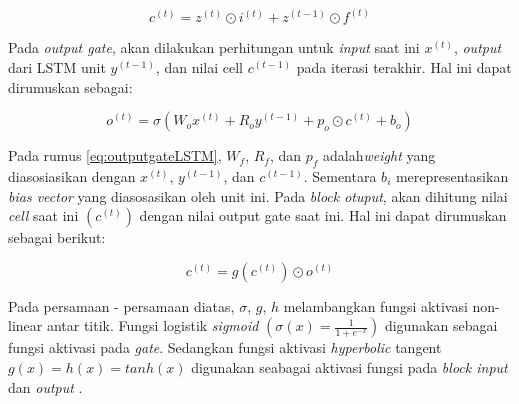 \begin{equation}
    \label{eq:cellLSTM}
    c^{(t)} =  z^{(t)} \odot  i^{(t)} + z^{(t-1)} \odot  f^{(t)}
\end{equation}

Pada \textit{output gate}, akan dilakukan perhitungan untuk \textit{input} saat ini $x^{(t)}$, \textit{output} dari LSTM unit $y^{(t-1)}$, dan nilai cell $c^{(t-1)}$ pada iterasi terakhir. Hal ini dapat dirumuskan sebagai:

\begin{equation}
    \label{eq:outputgateLSTM}
    o^{(t)} = \sigma(W_o x^{(t)} + R_o y^{(t-1)}+ p_o \odot c^{(t)} + b_o)
\end{equation}

Pada rumus \ref{eq:outputgateLSTM}, $W_f$, $R_f$, dan $p_f$ adalah\textit{weight} yang diasosiasikan dengan $x^{(t)}$, $y^{(t-1)}$, dan $c^{(t-1)}$. Sementara $b_i$ merepresentasikan \textit{bias vector} yang diasosasikan oleh unit ini. Pada \textit{block otuput}, akan dihitung nilai \textit{cell} saat ini $(c^{(t)})$ dengan nilai output gate saat ini. Hal ini dapat dirumuskan sebagai berikut:

\begin{equation}
    \label{eq:blockoutputLSTM}
    c^{(t)} =  g(c^{(t)}) \odot o^{(t)}
\end{equation}

Pada persamaan - persamaan diatas, $\sigma$, $g$, $h$ melambangkan fungsi aktivasi non-linear antar titik. Fungsi logistik \textit{sigmoid} $(\sigma(x) = \frac{1}{1 + e^{-x}})$ digunakan sebagai fungsi aktivasi pada \textit{gate}. Sedangkan fungsi aktivasi \textit{hyperbolic} tangent $g(x) = h(x) = tanh(x)$ digunakan seabagai aktivasi fungsi pada \textit{block input} dan \textit{output} \parencite{van2020}.


 


